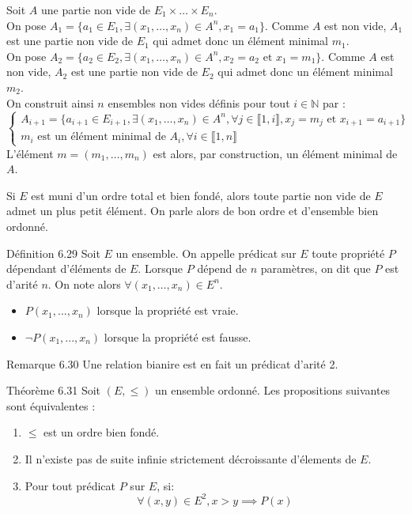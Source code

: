     \begin{demonstration}
        Soit $A$ une partie non vide de $E_1 \times \ldots \times E_n$.\\
        On pose $A_1 = \{a_1 \in E_1, \exists (x_1,\ldots,x_n) \in A^n, x_1 = a_1\}$. Comme $A$ est non vide, $A_1$ est une partie non vide de $E_1$ qui admet donc un élément minimal $m_1$.\\
        On pose $A_2 = \{a_2 \in E_2, \exists (x_1,\ldots,x_n) \in A^n, x_2 = a_2 \text{ et } x_1 = m_1\}$. Comme $A$ est non vide, $A_2$ est une partie non vide de $E_2$ qui admet donc un élément minimal $m_2$. \\
        On construit ainsi $n$ ensembles non vides définis pour tout $i \in \mathbb{N}$ par : 
    $$\begin{cases}
        A_{i+1} = \{a_{i+1} \in E_{i+1}, \exists (x_1, \ldots, x_n) \in A^n, \forall j \in \llbracket 1, i \rrbracket, x_j = m_j \text{ et } x_{i+1} = a_{i+1}\} \\
        m_i \text{ est un élément minimal de } A_i, \forall i \in \llbracket 1,n \rrbracket 
    \end{cases}$$
    L'élément $m = (m_1, \ldots, m_n)$ est alors, par construction, un élément minimal de $A$.
    \end{demonstration}

    \begin{remarque}{6.28}{}
        \item Si $E$ est muni d'un ordre total et bien fondé, alors toute partie non vide de $E$ admet un plus petit élément. On parle alors de bon ordre et d'ensemble bien ordonné.
    \end{remarque}

    Définition 6.29
    Soit $E$ un ensemble. On appelle prédicat sur $E$ toute propriété $P$ dépendant d'éléments de $E$.
    Lorsque $P$ dépend de $n$ paramètres, on dit que $P$ est d'arité $n$. On note alors $\forall (x_1, \ldots, x_n) \in E^n$. \begin{itemize}
        \item $P(x_1,...,x_n)$ lorsque la propriété est vraie.
        \item $\lnot P(x_1,...,x_n)$ lorsque la propriété est fausse.
    \end{itemize}

    Remarque 6.30
    Une relation bianire est en fait un prédicat d'arité 2.

    Théorème 6.31
    Soit $(E,\leq)$ un ensemble ordonné. Les propositions suivantes sont équivalentes : \begin{enumerate}
        \item $\leq$ est un ordre bien fondé.
        \item Il n'existe pas de suite infinie strictement décroissante d'élements de $E$.
        \item Pour tout prédicat $P$ sur $E$, si: $$\forall (x,y) \in E^2, x > y \implies P(x)$$
    \end{enumerate}


